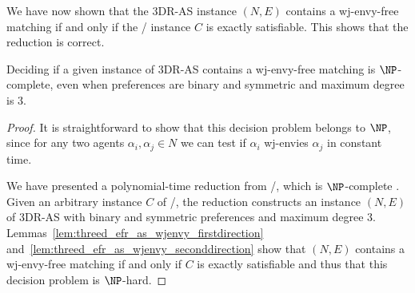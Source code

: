 We have now shown that the 3DR-AS instance $(N, E)$ contains a wj-envy-free matching if and only if the \porschenxsatvariant/ instance $C$ is exactly satisfiable. This shows that the reduction is correct.

\begin{thm}
\label{thm:threed_efr_as_wjef_npcomplete}
Deciding if a given instance of 3DR-AS contains a wj-envy-free matching is $\NP$-complete, even when preferences are binary and symmetric and maximum degree is $3$.
\end{thm}
\begin{proof}
It is straightforward to show that this decision problem belongs to $\NP$, since for any two agents $\alpha_i, \alpha_j \in N$ we can test if $\alpha_i$ wj-envies $\alpha_j$ in constant time. 

We have presented a polynomial-time reduction from \porschenxsatvariant/, which is $\NP$-complete \cite{PSSW14}. Given an arbitrary instance $C$ of \porschenxsatvariant/, the reduction constructs an instance $(N, E)$ of 3DR-AS with binary and symmetric preferences and maximum degree $3$. Lemmas~\ref{lem:threed_efr_as_wjenvy_firstdirection} and~\ref{lem:threed_efr_as_wjenvy_seconddirection} show that $(N, E)$ contains a wj-envy-free matching if and only if $C$ is exactly satisfiable and thus that this decision problem is $\NP$-hard.
\end{proof}

